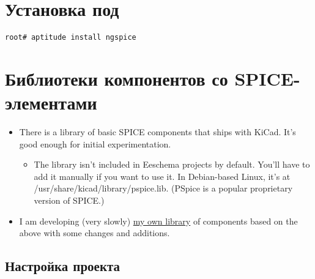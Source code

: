 
\section{Установка  под \linux}

\begin{verbatim}
root# aptitude install ngspice
\end{verbatim}

\section{Библиотеки компонентов со SPICE-элементами}

\begin{itemize}

\item There is a library of basic SPICE components that ships with KiCad. It's
good enough for initial experimentation.

\begin{itemize}
\item The library isn't included in Eeschema projects by default. You'll have to
add it manually if you want to use it.
In Debian-based Linux, it's at \\/usr/share/kicad/library/pspice.lib. (PSpice is
a popular proprietary version of SPICE.)
\end{itemize}

\item I am developing (very slowly)
\href{https://bitbucket.org/mithat/kicad-spice-library}{my own
library}
of components based on the above with some changes and additions.

\end{itemize}

\subsection{Настройка проекта}

